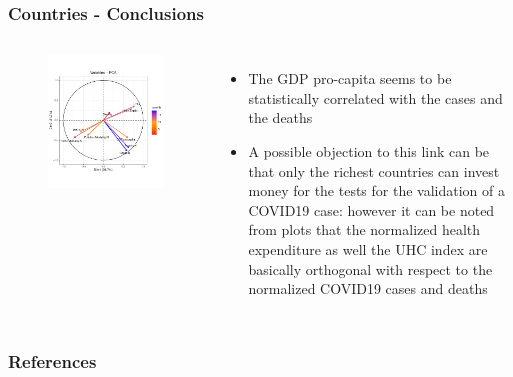 \documentclass[compress]{beamer}
\begin{document}
\begin{frame}
\frametitle{Countries - Conclusions}
\begin{columns}
\begin{figure}[H]
\centering
\begin{minipage}{\textwidth}
  \centering
  \includegraphics[width=\linewidth, ]{Pic/PCA-Loadings_WORLD.pdf}
\end{minipage}%
\end{figure}
\begin{itemize}
\item The GDP pro-capita seems to be statistically correlated with the cases and the deaths
\item A possible objection to this link can be that only the richest countries can invest money
for the tests for the validation of a COVID19 case: however it can be noted from plots that the normalized health expenditure as well the UHC index are basically orthogonal with respect to the normalized COVID19 cases and deaths
\end{itemize}
\end{columns}
\end{frame}





\begin{frame}[t,allowframebreaks]
\frametitle{References}
\printbibliography
\end{frame}
\end{document}
